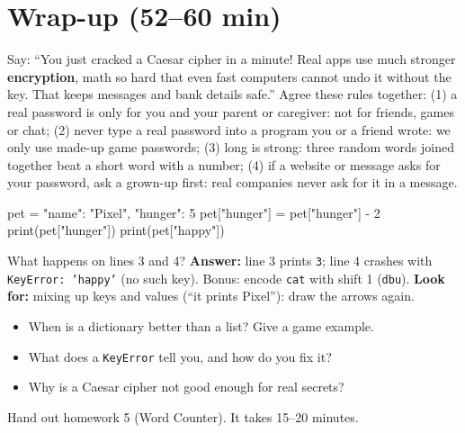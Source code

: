 \section{Wrap-up (52--60 min)}
\begin{safety}
Say: \enquote{You just cracked a Caesar cipher in a minute! Real apps use much stronger \textbf{encryption}, math so hard
that even fast computers cannot undo it without the key. That keeps messages and bank details safe.} Agree these rules together:
(1) a real password is only for you and your parent or caregiver: not for friends, games or chat;
(2) never type a real password into a program you or a friend wrote: we only use made-up game passwords;
(3) long is strong: three random words joined together beat a short word with a number;
(4) if a website or message asks for your password, ask a grown-up first: real companies never ask for it in a message.
\end{safety}

\begin{formativecheck}
\begin{pycode}
pet = {"name": "Pixel", "hunger": 5}
pet["hunger"] = pet["hunger"] - 2
print(pet["hunger"])
print(pet["happy"])
\end{pycode}
What happens on lines 3 and 4? \textbf{Answer:} line 3 prints \texttt{3}; line 4 crashes with \texttt{KeyError: 'happy'} (no such key).
Bonus: encode \texttt{cat} with shift 1 (\texttt{dbu}). \textbf{Look for:} mixing up keys and values (\enquote{it prints Pixel}): draw the arrows again.
\end{formativecheck}

\begin{reflection}
\begin{itemize}[leftmargin=1.2em]
  \item When is a dictionary better than a list? Give a game example.
  \item What does a \texttt{KeyError} tell you, and how do you fix it?
  \item Why is a Caesar cipher not good enough for real secrets?
\end{itemize}
\end{reflection}
Hand out homework 5 (Word Counter). It takes 15--20 minutes.

